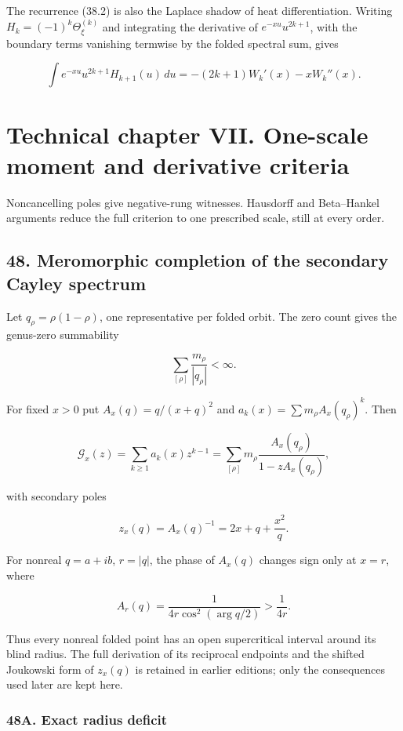 \documentclass[
  11pt,
]{book}
\begin{document}
The recurrence (38.2) is also the Laplace shadow of heat
differentiation. Writing \(H_k=(-1)^k\Theta_\xi^{(k)}\) and integrating
the derivative of \(e^{-xu}u^{2k+1}\), with the boundary terms vanishing
termwise by the folded spectral sum, gives

\[
\int e^{-xu}u^{2k+1}H_{k+1}(u)\,du
=-(2k+1)W_k'(x)-xW_k''(x).
\]


\chapter{Technical chapter VII. One-scale moment and derivative
criteria}\label{technical-chapter-vii.-one-scale-moment-and-derivative-criteria}

Noncancelling poles give negative-rung witnesses. Hausdorff and
Beta--Hankel arguments reduce the full criterion to one prescribed
scale, still at every order.

\section{48. Meromorphic completion of the secondary Cayley
spectrum}\label{meromorphic-completion-of-the-secondary-cayley-spectrum}

Let \(q_\rho=\rho(1-\rho)\), one representative per folded orbit. The
zero count gives the genus-zero summability

\[
\sum_{[\rho]}\frac{m_\rho}{|q_\rho|}<\infty.
\tag{48.1}
\]

For fixed \(x>0\) put \(A_x(q)=q/(x+q)^2\) and
\(a_k(x)=\sum m_\rho A_x(q_\rho)^k\). Then

\[
\mathcal G_x(z)=\sum_{k\ge1}a_k(x)z^{k-1}
=\sum_{[\rho]}m_\rho\frac{A_x(q_\rho)}{1-zA_x(q_\rho)},
\tag{48.4}
\]

with secondary poles

\[
z_x(q)=A_x(q)^{-1}=2x+q+\frac{x^2}{q}.
\tag{48.5}
\]

For nonreal \(q=a+ib\), \(r=|q|\), the phase of \(A_x(q)\) changes sign
only at \(x=r\), where

\[
A_r(q)=\frac1{4r\cos^2(\arg q/2)}>\frac1{4r}.
\tag{48.13}
\]

Thus every nonreal folded point has an open supercritical interval
around its blind radius. The full derivation of its reciprocal endpoints
and the shifted Joukowski form of \(z_x(q)\) is retained in earlier
editions; only the consequences used later are kept here.

\subsection{48A. Exact radius deficit}\label{a.-exact-radius-deficit}
\end{document}
